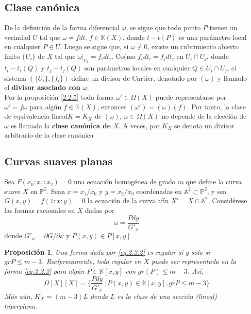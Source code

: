 \documentclass[12pt,a4paper]{report}
\newcommand{\K}{\mathbb{K}}
\newtheorem{prop}{Proposición}[chapter]
\begin{document}
\subsection{Clase canónica}
De la definición de la forma diferencial $\omega$, se sigue que todo punto $P$ tienen un vecindad $U$ tal que $\omega= fdt$, $f \in \K(X)$, donde $t-t(P)$ es una parámetro local en cualquier $P \in U$. Luego se sigue que, si $\omega \neq0$, existe un cubrimiento abierto finito $\{U_{i}\}$ de $X$ tal que $\omega|_{U_{i}}=f_{i}dt_{i}$. Co(mo $f_{i}dt_{i}= f_{j}dt_{j}$ en $U_{i}\cap U_{j}$, donde $t_{i}-t_{i}(Q)$ y $t_{j}-t_{j}(Q)$ son parámetros locales en cualquier $Q \in U_{i}\cap U_{j}$, el sistema $(\{ U_{i} \}, \{f_{i} \})$ define un divisor de Cartier, denotado por $(\omega)$ y llamado el \textbf{divisor asociado con $\omega$}. \\
Por la proposición \ref{2.2.5} toda forma $\omega' \in \Omega(X)$ puede representarse por $\omega' = f \omega$ para algún $f \in \K(X)$, entonces $(\omega') = (\omega ){(f)}$. Por tanto, la clase de equivalencia lineal$K = K_{X}$ de $(\omega)$, $\omega \in \Omega (X)$ no depende de la elección de $\omega{}$ es llamada la \textbf{clase canónica de $X$}. A veces, por $K_{X}$ se denota un divisor arbitrario  de la clase canónica

\subsection{Curvas suaves planas}
Sea $F(x_{0} : x_{1} :x_{2})=0$ una ecuación homogénea de grado $m$ que define la curva suave $X$ en $\mathbb{P}^{2}$. Sean $x=x_{1}/x_{0}$ y $y=x_{2}/x_{0}$ coordenadas en $\mathbb{A}^{2}\subset \mathbb{P}^{2}$, y sea $G(x,y)=f(1:x:y)=0$ la ecuación de la curva afín $X'=X \cap \mathbb{A}^{2}$. Considérese las formas racionales en $X$ dadas por \begin{equation} \label{eq.2.2.2}
\omega = \frac{Pdy}{G'_{x}}
\end{equation}
donde $G'_{x} =  \partial G/ \partial x$ y $P(x,y)\in P[x,y]$


\begin{prop}
	Una forma dada por \ref{eq.2.2.2} es regular si y solo si $grP \leq m-3$. Recíprocamente, toda regular en $X$ puede ser representada en la forma \ref{eq.2.2.2} para algún $P \in \K[x,y]$ con $gr (P)\leq m-3$. Así,
$$	\Omega[X] [X] =  \{ \frac{Pdy}{G'_{x}} \, | \, P(x,y) \in \K[x,y], gr P \leq m-3 \} $$
	Más aún, $K_{X}=(m-3)L$ donde $L$ es la clase de una sección (lineal) hiperplana.
\end{prop}
\end{document}
